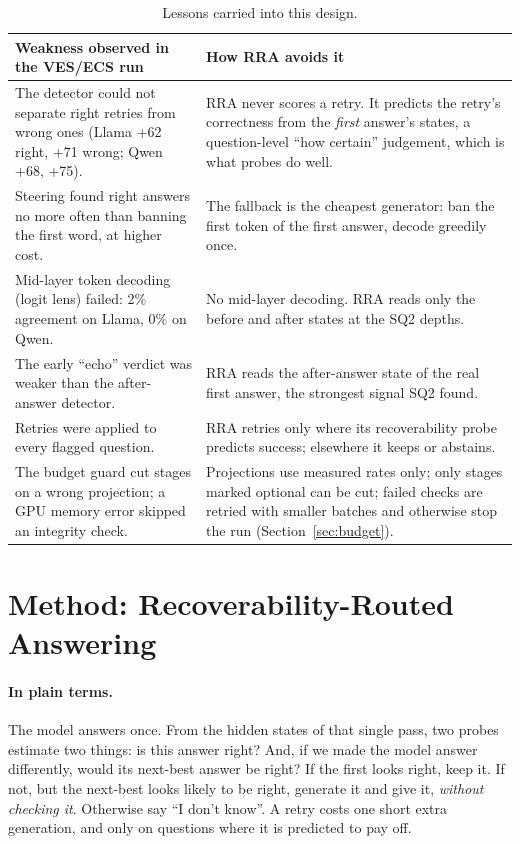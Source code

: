\documentclass[11pt]{article}
\begin{document}
\begin{table}[H]
\centering
\small
\begin{tabularx}{\textwidth}{@{}LL@{}}
\toprule
Weakness observed in the VES/ECS run & How RRA avoids it \\
\midrule
The detector could not separate right retries from wrong ones (Llama +62 right, +71 wrong; Qwen +68, +75). &
RRA never scores a retry. It predicts the retry's correctness from the \emph{first} answer's states, a
question-level ``how certain'' judgement, which is what probes do well. \\
Steering found right answers no more often than banning the first word, at higher cost. &
The fallback is the cheapest generator: ban the first token of the first answer, decode greedily once. \\
Mid-layer token decoding (logit lens) failed: 2\% agreement on Llama, 0\% on Qwen. &
No mid-layer decoding. RRA reads only the before and after states at the SQ2 depths. \\
The early ``echo'' verdict was weaker than the after-answer detector. &
RRA reads the after-answer state of the real first answer, the strongest signal SQ2 found. \\
Retries were applied to every flagged question. &
RRA retries only where its recoverability probe predicts success; elsewhere it keeps or abstains. \\
The budget guard cut stages on a wrong projection; a GPU memory error skipped an integrity check. &
Projections use measured rates only; only stages marked optional can be cut; failed checks are retried with
smaller batches and otherwise stop the run (Section~\ref{sec:budget}). \\
\bottomrule
\end{tabularx}
\caption{Lessons carried into this design.}
\end{table}

\section{Method: Recoverability-Routed Answering}

\paragraph{In plain terms.} The model answers once. From the hidden states of that single pass, two probes
estimate two things: is this answer right? And, if we made the model answer differently, would its next-best
answer be right? If the first looks right, keep it. If not, but the next-best looks likely to be right, generate
it and give it, \emph{without checking it}. Otherwise say ``I don't know''. A retry costs one short extra
generation, and only on questions where it is predicted to pay off.
\end{document}

